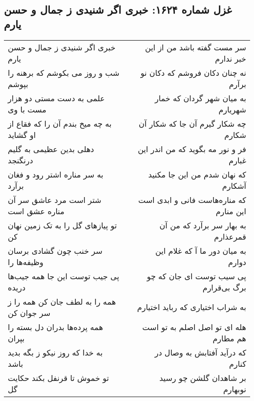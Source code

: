 \begin{center}
\section*{غزل شماره ۱۶۲۴: خبری اگر شنیدی ز جمال و حسن یارم}
\label{sec:1624}
\begin{longtable}{l p{0.5cm} r}
خبری اگر شنیدی ز جمال و حسن یارم
&&
سر مست گفته باشد من از این خبر ندارم
\\
شب و روز می بکوشم که برهنه را بپوشم
&&
نه چنان دکان فروشم که دکان نو برآرم
\\
علمی به دست مستی دو هزار مست با وی
&&
به میان شهر گردان که خمار شهریارم
\\
به چه میخ بندم آن را که فقاع از او گشاید
&&
چه شکار گیرم آن جا که شکار آن شکارم
\\
دهلی بدین عظیمی به گلیم درنگنجد
&&
فر و نور مه بگوید که من اندر این غبارم
\\
به سر مناره اشتر رود و فغان برآرد
&&
که نهان شدم من این جا مکنید آشکارم
\\
شتر است مرد عاشق سر آن مناره عشق است
&&
که مناره‌هاست فانی و ابدی است این منارم
\\
تو پیازهای گل را به تک زمین نهان کن
&&
به بهار سر برآرد که من آن قمرعذارم
\\
سر خنب چون گشادی برسان وظیفه‌ها را
&&
به میان دور ما آ که غلام این دوارم
\\
پی جیب توست این جا همه جیب‌ها دریده
&&
پی سیب توست ای جان که چو برگ بی‌قرارم
\\
همه را به لطف جان کن همه را ز سر جوان کن
&&
به شراب اختیاری که رباید اختیارم
\\
همه پرده‌ها بدران دل بسته را بپران
&&
هله ای تو اصل اصلم به تو است هم مطارم
\\
به خدا که روز نیکو ز بگه بدید باشد
&&
که درآید آفتابش به وصال در کنارم
\\
تو خموش تا قرنفل بکند حکایت گل
&&
بر شاهدان گلشن چو رسید نوبهارم
\\
\end{longtable}
\end{center}
